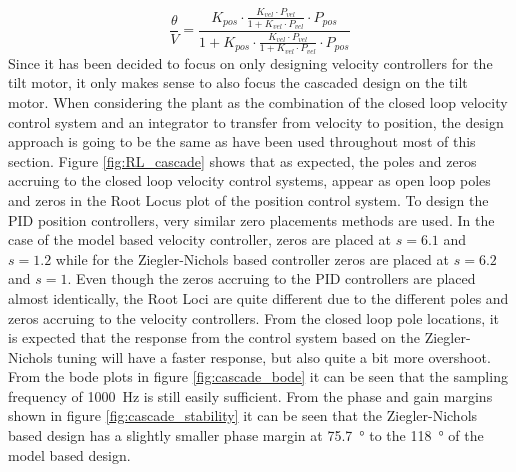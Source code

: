 \documentclass[../../main.tex]{subfiles}
\begin{document}
\begin{equation} \label{eq:tf_cascaded_design}
    \frac{\theta}{V}=\frac{K_{pos}\cdot\frac{K_{vel}\cdot P_{vel}}{1+K_{vel}\cdot P_{vel}}\cdot P_{pos}}{1+ K_{pos}\cdot\frac{K_{vel}\cdot P_{vel}}{1+K_{vel}\cdot P_{vel}}\cdot P_{pos}}
\end{equation}
Since it has been decided to focus on only designing velocity controllers for the tilt motor, it only makes sense to also focus the cascaded design on the tilt motor.
When considering the plant as the combination of the closed loop velocity control system and an integrator to transfer from velocity to position, the design approach is going to be the same as have been used throughout most of this section. 
Figure \ref{fig:RL_cascade} shows that as expected, the poles and zeros accruing to the closed loop velocity control systems, appear as open loop poles and zeros in the Root Locus plot of the position control system. To design the PID position controllers, very similar zero placements methods  are used. In the case of the model based velocity controller, zeros are placed at $s = 6.1$ and $s = 1.2$ while for the Ziegler-Nichols based controller zeros are placed at $s = 6.2$ and $s = 1$. Even though the zeros accruing to the PID controllers are placed almost identically, the Root Loci are quite different due to the different poles and zeros accruing to the velocity controllers. From the closed loop pole locations, it is expected that the response from the control system based on the Ziegler-Nichols tuning will have a faster response, but also quite a bit more overshoot. From the bode plots in figure \ref{fig:cascade_bode} it can be seen that the sampling frequency of \SI{1000}{\hertz} is still easily sufficient. From the phase and gain margins shown in figure \ref{fig:cascade_stability} it can be seen that the Ziegler-Nichols based design has a slightly smaller phase margin at \SI{75.7}{\degree} to the \SI{118}{\degree} of the model based design.
\end{document}
